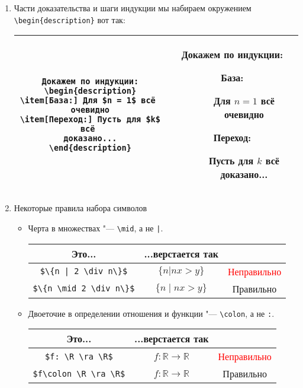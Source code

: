 \documentclass[12pt,a4paper]{book}
\def\ra{\rightarrow}
\def\R{\mathbb{R}}
\newcommand{\ok}{& \textcolor{green!60!black}{Правильно}}
\newcommand{\bad}{& \textcolor{red}{Неправильно}}
\begin{document}
\begin{enumerate}
\item 
	Части доказательства и шаги индукции мы набираем окружением \verb'\begin{description}' вот так:
	\begin{center}\begin{tabular}{|c|c|}
		\hline
		\begin{minipage}{8cm}
			\begin{verbatim}
Докажем по индукции:
\begin{description}
\item[База:] Для $n = 1$ всё 
очевидно
\item[Переход:] Пусть для $k$ всё 
доказано...
\end{description}
\end{verbatim}
		\end{minipage}
		&
		\begin{minipage}{7cm}
			Докажем по индукции:
			\begin{description}
				\item[База:] Для $n = 1$ всё очевидно
				\item[Переход:] Пусть для $k$ всё доказано...
			\end{description}
		\end{minipage} \\
		\hline
	\end{tabular}\end{center}

\item
	Некоторые правила набора символов
	\begin{itemize}
	\item 
		Черта в множествах "--- \verb'\mid', а не \verb'|'.
		\begin{center}\begin{tabular}{|c|c|c|}
			\hline Это... & ...верстается так & \\
			\hline \verb'$\{n | 2 \div n\}$' & $\{n | nx > y\}$ \bad \\
			\hline \verb'$\{n \mid 2 \div n\}$' & $\{n \mid nx > y\}$ \ok \\
			\hline
		\end{tabular}\end{center}
	
	\item 
		Двоеточие в определении отношения и функции "--- \verb'\colon', а не \verb':'.
		\begin{center}\begin{tabular}{|c|c|c|}
			\hline Это... & ...верстается так & \\
			\hline \verb'$f: \R \ra \R$' & $f:\R\ra\R$ \bad \\
			\hline \verb'$f\colon \R \ra \R$' & $f\colon\R\ra\R$ \ok \\
			\hline
		\end{tabular}\end{center}


\end{itemize}
\end{enumerate}
\end{document}
